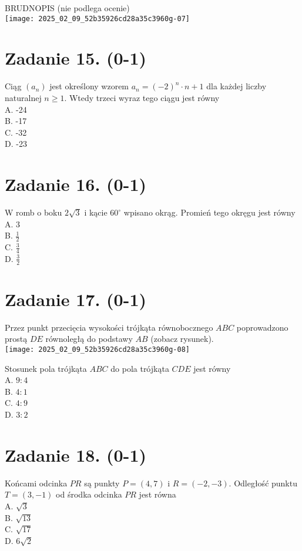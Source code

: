 \documentclass[10pt]{article}
\begin{document}
BRUDNOPIS (nie podlega ocenie)\\
\texttt{[image: 2025\_02\_09\_52b35926cd28a35c3960g-07]}

\section*{Zadanie 15. (0-1)}
Ciąg \(\left(a_{n}\right)\) jest określony wzorem \(a_{n}=(-2)^{n} \cdot n+1\) dla każdej liczby naturalnej \(n \geq 1\). Wtedy trzeci wyraz tego ciągu jest równy\\
A. -24\\
B. -17\\
C. -32\\
D. -23

\section*{Zadanie 16. (0-1)}
W romb o boku \(2 \sqrt{3}\) i kącie \(60^{\circ}\) wpisano okrąg. Promień tego okręgu jest równy\\
A. 3\\
B. \(\frac{1}{2}\)\\
C. \(\frac{3}{4}\)\\
D. \(\frac{3}{2}\)

\section*{Zadanie 17. (0-1)}
Przez punkt przecięcia wysokości trójkąta równobocznego \(A B C\) poprowadzono prostą \(D E\) równoległą do podstawy \(A B\) (zobacz rysunek).\\
\texttt{[image: 2025\_02\_09\_52b35926cd28a35c3960g-08]}

Stosunek pola trójkąta \(A B C\) do pola trójkąta \(C D E\) jest równy\\
A. \(9: 4\)\\
B. \(4: 1\)\\
C. \(4: 9\)\\
D. \(3: 2\)

\section*{Zadanie 18. (0-1)}
Końcami odcinka \(P R\) są punkty \(P=(4,7)\) i \(R=(-2,-3)\). Odległość punktu \(T=(3,-1)\) od środka odcinka \(P R\) jest równa\\
A. \(\sqrt{3}\)\\
B. \(\sqrt{13}\)\\
C. \(\sqrt{17}\)\\
D. \(6 \sqrt{2}\)
\end{document}
